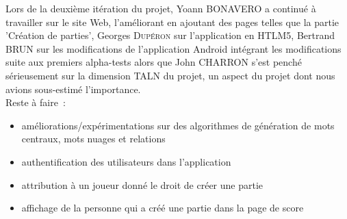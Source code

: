 \documentclass[a4paper,11pt,french]{article}
\begin{document}
\noindent Lors de la deuxième itération du projet, Yoann \textsc{BONAVERO} a continué à travailler sur le site Web, l'améliorant en ajoutant des pages telles que la partie 'Création de parties', Georges \textsc{Dupéron} sur l'application en HTLM5, Bertrand \textsc{BRUN} sur les modifications de l'application Android\texttrademark{} intégrant les modifications suite aux premiers alpha-tests alors que John \textsc{CHARRON} s'est penché sérieusement sur la dimension TALN du projet, un aspect du projet dont nous avions sous-estimé l'importance. 
\\

\noindent Reste à faire~:
\begin{itemize}
  \item améliorations/expérimentations sur des algorithmes de génération de mots centraux, mots nuages et relations
  \item authentification des utilisateurs dans l'application
  \item attribution à un joueur donné le droit de créer une partie
  \item affichage de la personne qui a créé une partie dans la page de score 
\end{itemize}
\end{document}
